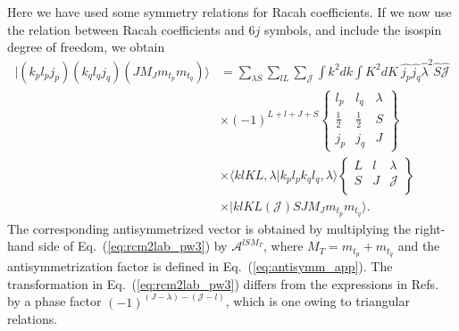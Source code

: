 \documentclass[a4paper,12pt]{report}
\begin{document}
Here we have used some symmetry relations for Racah coefficients. 
 If we now use the relation between Racah coefficients and 
$6j$ symbols, and include the isospin degree of freedom, we 
obtain
\begin{align} \label{eq:rcm2lab_pw3}
  |(k_{p}l_{p}j_{p})(k_{q}l_{q}j_{q})(JM_{J}m_{t_{p}}m_{t_{q}})\rangle
  &= \sum_{\lambda S}\sum_{lL}\sum_{\mathcal{J}}
  \int k^{2}dk \int K^{2}dK \: \hat{j_{p}}\hat{j_{q}}
  \hat{\lambda }^{2}\hat{S}\hat{\mathcal{J}} \nonumber \\
  & \times (-1)^{L+l+J+S} 
  \left\{ \begin{array}{ccc}
    l_{p} & l_{q} & \lambda \\
    \frac{1}{2} & \frac{1}{2} & S \\
    j_{p} & j_{q} & J 
  \end{array} \right\} \nonumber \\
  & \times 
  \langle klKL,\lambda |k_{p}l_{p}k_{q}l_{q},\lambda \rangle
  \left\{ \begin{array}{ccc}
    L & l & \lambda \\
    S & J & \mathcal{J} \\
  \end{array} \right\}  \nonumber \\
  & \times |klKL(\mathcal{J})SJM_{J}m_{t_{p}}m_{t_{q}}\rangle .
\end{align}
The corresponding antisymmetrized vector is obtained by 
multiplying the right-hand side of Eq.~(\ref{eq:rcm2lab_pw3}) 
by $\mathcal{A}^{lSM_{T}}$, where $M_{T} = m_{t_{p}}+m_{t_{q}}$ 
and the antisymmetrization factor is defined in 
Eq.~(\ref{eq:antisymm_app}). The transformation in 
Eq.~(\ref{eq:rcm2lab_pw3}) differs from the expressions in 
Refs.~\cite{kung1979,hjensen1993} by a phase factor
$(-1)^{(J-\lambda )-(\mathcal{J}-l)}$, which is one owing to
triangular relations.
\end{document}
